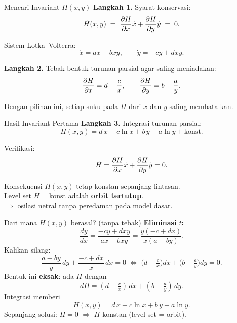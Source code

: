 \documentclass[aspectratio=32]{beamer}
\begin{document}
\begin{frame}{Mencari Invariant $H(x,y)$}
  \small
  \textbf{Langkah 1.} Syarat konservasi:
  \[
    \dot{H}(x,y) \;=\; \pdv{H}{x}\dot{x} + \pdv{H}{y}\dot{y} \;=\; 0.
  \]

  Sistem Lotka–Volterra:
  \[
    \dot{x} = ax - bxy, \qquad \dot{y} = -cy + dxy.
  \]

  \vspace{0.5em}
  \textbf{Langkah 2.} Tebak bentuk turunan parsial agar saling meniadakan:
  \[
    \pdv{H}{x} = d - \frac{c}{x}, 
    \qquad 
    \pdv{H}{y} = b - \frac{a}{y}.
  \]

  \vspace{0.5em}
  Dengan pilihan ini, setiap suku pada $\dot{H}$ dari $\dot{x}$ dan $\dot{y}$ saling membatalkan.
\end{frame}

\begin{frame}{Hasil Invariant Pertama}
  \small
  \textbf{Langkah 3.} Integrasi turunan parsial:
  \[
    H(x,y) = d\,x - c \ln x + b\,y - a \ln y + \text{konst}.
  \]

  \vspace{0.5em}
  Verifikasi:
  \[
    \dot{H} = \pdv{H}{x}\dot{x} + \pdv{H}{y}\dot{y} = 0.
  \]

  \vspace{0.5em}
  \begin{block}{Konsekuensi}
    $H(x,y)$ tetap konstan sepanjang lintasan.\\
    Level set $H=\text{konst}$ adalah \textbf{orbit tertutup}.\\
    $\Rightarrow$ osilasi netral tanpa peredaman pada model dasar.
  \end{block}
\end{frame}

\begin{frame}{Dari mana $H(x,y)$ berasal? (tanpa tebak)}
  \small
  \textbf{Eliminasi $t$:}
  \[
    \frac{dy}{dx}=\frac{-cy+dxy}{ax-bxy}
    =\frac{y(-c+dx)}{x(a-by)}.
  \]
  Kalikan silang:
  \[
    \frac{a-by}{y}\,dy+\frac{-c+dx}{x}\,dx=0
    \;\Longleftrightarrow\;
    \bigl(d-\tfrac{c}{x}\bigr)dx+\bigl(b-\tfrac{a}{y}\bigr)dy=0.
  \]
  Bentuk ini \textbf{eksak}: ada $H$ dengan
  \[
    dH=(d-\tfrac{c}{x})\,dx+(b-\tfrac{a}{y})\,dy.
  \]
  Integrasi memberi
  \[
    \boxed{H(x,y)=d\,x-c\ln x+b\,y-a\ln y}.
  \]
  Sepanjang solusi: $\dot H=0$ $\Rightarrow$ $H$ konstan (level set = orbit).
\end{frame}
\end{document}
